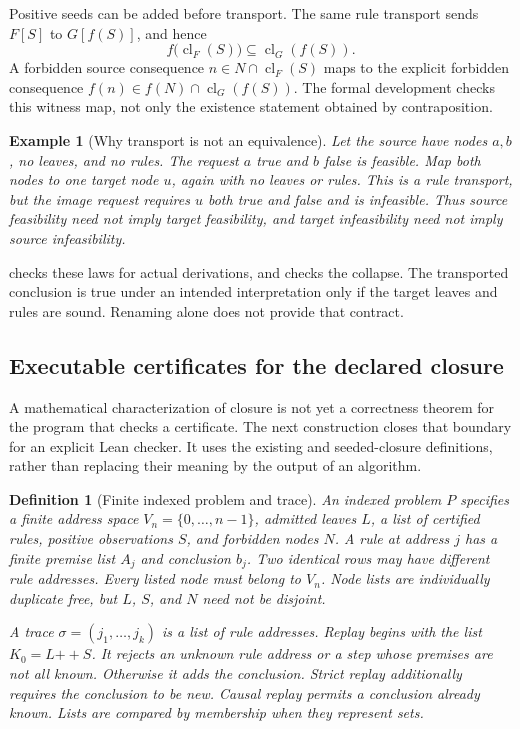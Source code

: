 \documentclass[11pt,oneside]{article}
\theoremstyle{komorebiplain}
\theoremstyle{komorebidefinition}
\newtheorem{definition}[theorem]{Definition}
\newtheorem{example}[theorem]{Example}
\theoremstyle{komorebiremark}
\begin{document}
Positive seeds can be added before transport. The same rule transport sends $F[S]$ to $G[f(S)]$, and hence
\[
 f\bigl(\operatorname{cl}_F(S)\bigr)
      \subseteq\operatorname{cl}_G(f(S)).
\]
A forbidden source consequence $n\in N\cap\operatorname{cl}_F(S)$ maps to the explicit forbidden consequence $f(n)\in f(N)\cap\operatorname{cl}_G(f(S))$. The formal development checks this witness map, not only the existence statement obtained by contraposition.

\begin{example}[Why transport is not an equivalence]
\label{res:new:collapse}
Let the source have nodes $a,b$, no leaves, and no rules. The request $a$ true and $b$ false is feasible. Map both nodes to one target node $u$, again with no leaves or rules. This is a rule transport, but the image request requires $u$ both true and false and is infeasible. Thus source feasibility need not imply target feasibility, and target infeasibility need not imply source infeasibility.
\end{example}

 checks these laws for actual derivations, and  checks the collapse. The transported conclusion is true under an intended interpretation only if the target leaves and rules are sound. Renaming alone does not provide that contract.


\subsection{Executable certificates for the declared closure}
\label{sec:trace-checker}

A mathematical characterization of closure is not yet a correctness theorem for the program that checks a certificate. The next construction closes that boundary for an explicit Lean checker. It uses the existing  and seeded-closure definitions, rather than replacing their meaning by the output of an algorithm.

\begin{definition}[Finite indexed problem and trace]
\label{res:trace:problem}
An indexed problem $P$ specifies a finite address space $V_n=\{0,\ldots,n-1\}$, admitted leaves $L$, a list of certified rules, positive observations $S$, and forbidden nodes $N$. A rule at address $j$ has a finite premise list $A_j$ and conclusion $b_j$. Two identical rows may have different rule addresses. Every listed node must belong to $V_n$. Node lists are individually duplicate free, but $L$, $S$, and $N$ need not be disjoint.

A trace $\sigma=(j_1,\ldots,j_k)$ is a list of rule addresses. Replay begins with the list $K_0=L\mathbin{+\!+}S$. It rejects an unknown rule address or a step whose premises are not all known. Otherwise it adds the conclusion. Strict replay additionally requires the conclusion to be new. Causal replay permits a conclusion already known. Lists are compared by membership when they represent sets.
\end{definition}
\end{document}
